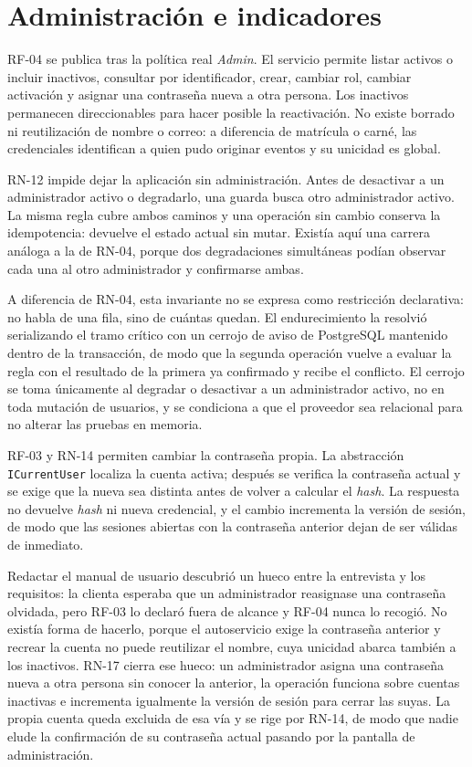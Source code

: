 \section{Administración e indicadores}

RF-04 se publica tras la política real \emph{Admin}. El servicio permite listar activos o incluir inactivos, consultar por identificador, crear, cambiar rol, cambiar activación y asignar una contraseña nueva a otra persona. Los inactivos permanecen direccionables para hacer posible la reactivación. No existe borrado ni reutilización de nombre o correo: a diferencia de matrícula o carné, las credenciales identifican a quien pudo originar eventos y su unicidad es global.

RN-12 impide dejar la aplicación sin administración. Antes de desactivar a un administrador activo o degradarlo, una guarda busca otro administrador activo. La misma regla cubre ambos caminos y una operación sin cambio conserva la \gls{idempotencia}: devuelve el estado actual sin mutar. Existía aquí una carrera análoga a la de RN-04, porque dos degradaciones simultáneas podían observar cada una al otro administrador y confirmarse ambas.

A diferencia de RN-04, esta invariante no se expresa como restricción declarativa: no habla de una fila, sino de cuántas quedan. El endurecimiento la resolvió serializando el tramo crítico con un cerrojo de aviso de PostgreSQL mantenido dentro de la transacción, de modo que la segunda operación vuelve a evaluar la regla con el resultado de la primera ya confirmado y recibe el conflicto. El cerrojo se toma únicamente al degradar o desactivar a un administrador activo, no en toda mutación de usuarios, y se condiciona a que el proveedor sea relacional para no alterar las pruebas en memoria.

RF-03 y RN-14 permiten cambiar la contraseña propia. La abstracción \texttt{ICurrentUser} localiza la cuenta activa; después se verifica la contraseña actual y se exige que la nueva sea distinta antes de volver a calcular el \emph{hash}. La respuesta no devuelve \emph{hash} ni nueva credencial, y el cambio incrementa la versión de sesión, de modo que las sesiones abiertas con la contraseña anterior dejan de ser válidas de inmediato.

Redactar el manual de usuario descubrió un hueco entre la entrevista y los requisitos: la clienta esperaba que un administrador reasignase una contraseña olvidada, pero RF-03 lo declaró fuera de alcance y RF-04 nunca lo recogió. No existía forma de hacerlo, porque el autoservicio exige la contraseña anterior y recrear la cuenta no puede reutilizar el nombre, cuya unicidad abarca también a los inactivos. RN-17 cierra ese hueco: un administrador asigna una contraseña nueva a otra persona sin conocer la anterior, la operación funciona sobre cuentas inactivas e incrementa igualmente la versión de sesión para cerrar las suyas. La propia cuenta queda excluida de esa vía y se rige por RN-14, de modo que nadie elude la confirmación de su contraseña actual pasando por la pantalla de administración.

